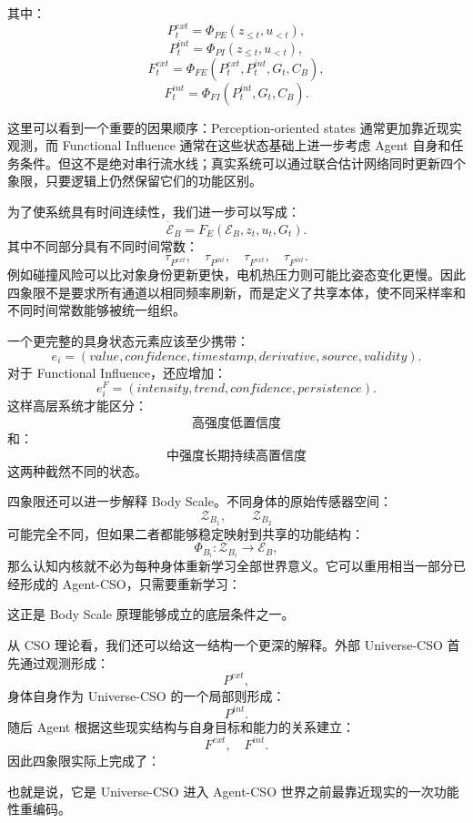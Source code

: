 其中：
\[
P_t^{ext}
=
\Phi_{PE}
(
z_{\leq t},
u_{<t}
),
\]
\[
P_t^{int}
=
\Phi_{PI}
(
z_{\leq t},
u_{<t}
),
\]
\[
F_t^{ext}
=
\Phi_{FE}
(
P_t^{ext},
P_t^{int},
G_t,
C_B
),
\]
\[
F_t^{int}
=
\Phi_{FI}
(
P_t^{int},
G_t,
C_B
).
\]

这里可以看到一个重要的因果顺序：Perception-oriented states 通常更加靠近现实观测，而 Functional Influence 通常在这些状态基础上进一步考虑 Agent 自身和任务条件。但这不是绝对串行流水线；真实系统可以通过联合估计网络同时更新四个象限，只要逻辑上仍然保留它们的功能区别。

为了使系统具有时间连续性，我们进一步可以写成：
\[
\dot{\mathcal E}_B
=
F_E(
\mathcal E_B,
z_t,
u_t,
G_t
).
\]
其中不同部分具有不同时间常数：
\[
\tau_{P^{ext}},
\quad
\tau_{P^{int}},
\quad
\tau_{F^{ext}},
\quad
\tau_{F^{int}}.
\]
例如碰撞风险可以比对象身份更新更快，电机热压力则可能比姿态变化更慢。因此四象限不是要求所有通道以相同频率刷新，而是定义了共享本体，使不同采样率和不同时间常数能够被统一组织。

一个更完整的具身状态元素应该至少携带：
\[
e_i
=
(
value,
confidence,
timestamp,
derivative,
source,
validity
).
\]
对于 Functional Influence，还应增加：
\[
e_i^F
=
(
intensity,
trend,
confidence,
persistence
).
\]
这样高层系统才能区分：
\[
\text{高强度低置信度}
\]
和：
\[
\text{中强度长期持续高置信度}
\]
这两种截然不同的状态。

四象限还可以进一步解释 Body Scale。不同身体的原始传感器空间：
\[
\mathcal Z_{B_1},
\qquad
\mathcal Z_{B_2}
\]
可能完全不同，但如果二者都能够稳定映射到共享的功能结构：
\[
\Phi_{B_i}:
\mathcal Z_{B_i}
\rightarrow
\mathcal E_B,
\]
那么认知内核就不必为每种身体重新学习全部世界意义。它可以重用相当一部分已经形成的 Agent-CSO，只需要重新学习：
\begin{statementbox}
\centering
{}
\end{statementbox}
这正是 Body Scale 原理能够成立的底层条件之一。

从 CSO 理论看，我们还可以给这一结构一个更深的解释。外部 Universe-CSO 首先通过观测形成：
\[
P^{ext},
\]
身体自身作为 Universe-CSO 的一个局部则形成：
\[
P^{int}.
\]
随后 Agent 根据这些现实结构与自身目标和能力的关系建立：
\[
F^{ext},
\quad
F^{int}.
\]
因此四象限实际上完成了：
\begin{statementbox}
\centering
{}
\end{statementbox}
也就是说，它是 Universe-CSO 进入 Agent-CSO 世界之前最靠近现实的一次功能性重编码。

